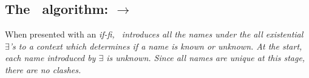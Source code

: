 \documentclass[manuscript,screen,review, 12pt, nonacm]{acmart}
\begin{document}
    \subsection{The \DTran\ algorithm: \VMinus $\rightarrow$ \D}

    When presented with an \it{if-fi}, \DTran\ introduces all the names under
    the all existential $\exists$'s to a context which determines if a name is
    \it{known} or \it{unknown}. At the start, each name introduced by $\exists$
    is \it{unknown}. Since all names are unique at this stage, there are no
    clashes. 




\end{document}
